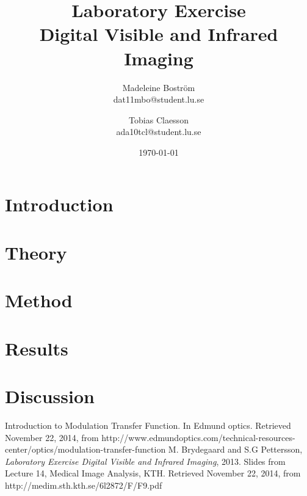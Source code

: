 \documentclass[a4paper]{article}
\begin{document}
\title{Laboratory Exercise \\Digital Visible and Infrared Imaging}
\author{
	Madeleine Bostr\"{o}m\\
	dat11mbo@student.lu.se
	\and
	Tobias Claesson\\
	ada10tcl@student.lu.se
}
\date{\today}
\maketitle


\section{Introduction}


\section{Theory}


\section{Method}


\section{Results}


\section{Discussion}


\clearpage

\begin{thebibliography}{count}
	Introduction to Modulation Transfer Function. In Edmund optics. Retrieved November 22, 2014, from  http://www.edmundoptics.com/technical-resources-center/optics/modulation-transfer-function
	M. Brydegaard and S.G Pettersson,
	\emph{Laboratory Exercise Digital Visible and Infrared Imaging}, 2013.
	Slides from Lecture 14, Medical Image Analysis, KTH. Retrieved November 22, 2014, from http://medim.sth.kth.se/6l2872/F/F9.pdf
	
\end{thebibliography}
\end{document}
